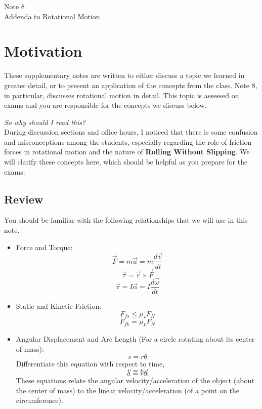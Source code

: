 \documentclass[11pt]{article}
\theoremstyle{gangnamstyle}{\newtheorem{definition}{Definition}[]}
\theoremstyle{gangnamstyle}{\newtheorem{example}{Example}[]}
\theoremstyle{gangnamstyle}{\newtheorem{problem}{Problem}[]}
\theoremstyle{gangnamstyle}{\newtheorem{warning}{Warning}[]}
\begin{document}
\normalfont
\pagestyle{pages}


\begin{center}
\vspace{3in}
{\Large Note 8 } \\[0.05in]
Addenda to Rotational Motion \\ [0.5in]
\end{center}


\section*{Motivation}

These supplementary notes are written to either discuss a topic we learned in greater detail, or to present an application of the concepts from the class. Note 8, in particular, discusses rotational motion in detail. This topic is assessed on exams and you are responsible for the concepts we discuss below. 

\textit{So why should I read this?} \\
During discussion sections and office hours, I noticed that there is some confusion and misconceptions among the students, especially regarding the role of friction forces in rotational motion and the nature of \textbf{Rolling Without Slipping}. We will clarify these concepts here, which should be helpful as you prepare for the exams. 

\subsection*{Review}

You should be familiar with the following relationships that we will use in this note. 
\begin{itemize}
\item Force and Torque: 
\[ \Vec{F} = m\Vec{a} = m\frac{d\Vec{v}}{dt} \]
\[ \Vec{\tau} = \Vec{r} \times \Vec{F} \]
\[ \Vec{\tau} = I\Vec{\alpha} = I\frac{d\Vec{\omega}}{dt} \]
\item Static and Kinetic Friction: 
\[ F_{fs} \leq \mu_s F_N \]
\[ F_{fk} = \mu_k F_N \]
\item Angular Displacement and Arc Length (For a circle rotating about its center of mass): 
\[ s = r\theta \]
Differentiate this equation with respect to time, 
\[ v = r\omega \]
\[ a = r\alpha \]
These equations relate the angular velocity/acceleration of the object (about the center of mass) to the linear velocity/acceleration (of a point on the circumference). 
\end{itemize}
\pagebreak
\end{document}
